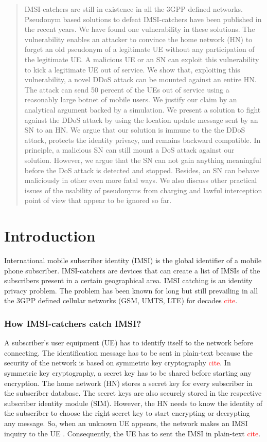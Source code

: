 \documentclass{llncs} %
\begin{document}
\begin{abstract}
IMSI-catchers are still in existence in all the 3GPP defined networks. Pseudonym based solutions to defeat IMSI-catchers have been published in the recent years. We have found one vulnerability in these solutions. The vulnerability enables an attacker to convince the home network (HN) to forget an old pseudonym of a legitimate UE without any participation of the legitimate UE. A malicious UE or an SN can exploit this vulnerability to kick a legitimate UE out of service. We show that, exploiting this vulnerability, a novel DDoS attack can be mounted against an entire HN. The attack can send 50 percent of the UEs out of service using a reasonably large botnet of mobile users. We justify our claim by an analytical argument backed by a simulation. We present a solution to fight against the DDoS attack by using the location update message sent by an SN to an HN. We argue that our solution is immune to the the DDoS attack, protects the identity privacy, and remains backward compatible. In principle, a malicious SN can still mount a DoS attack against our solution. However, we argue that the SN can not gain anything meaningful before the DoS attack is detected and stopped. Besides, an SN can behave maliciously in other even more fatal ways. We also discuss other practical issues of the usability of pseudonyms from charging and lawful interception point of view that appear to be ignored so far.
\end{abstract}


\section{Introduction} \label{intro}
International mobile subscriber identity (IMSI) is the global identifier of a mobile phone subscriber. IMSI-catchers are devices that can create a list of IMSIs of the subscribers present in a certain geographical area. IMSI catching is an identity privacy problem. The problem has been known for long but still prevailing in all the 3GPP defined cellular networks (GSM, UMTS, LTE) for decades \textcolor{red}{cite}. 

\subsubsection{How IMSI-catchers catch IMSI?} A subscriber's user equipment (UE) has to identify itself to the network before connecting. The identification message has to be sent in plain-text because the security of the network is based on symmetric key cryptography \textcolor{red}{cite}. In symmetric key cryptography, a secret key has to be shared before starting any encryption. The home network (HN) stores a secret key for every subscriber in the subscriber database. The secret keys are also securely stored in the respective subscriber identity module (SIM). However, the HN needs to know the identity of the subscriber to choose the right secret key to start encrypting or decrypting any message. So, when an unknown UE appears, the network makes an IMSI inquiry to the UE . Consequently, the UE has to sent the IMSI in plain-text \textcolor{red}{cite}. 
\end{document}
